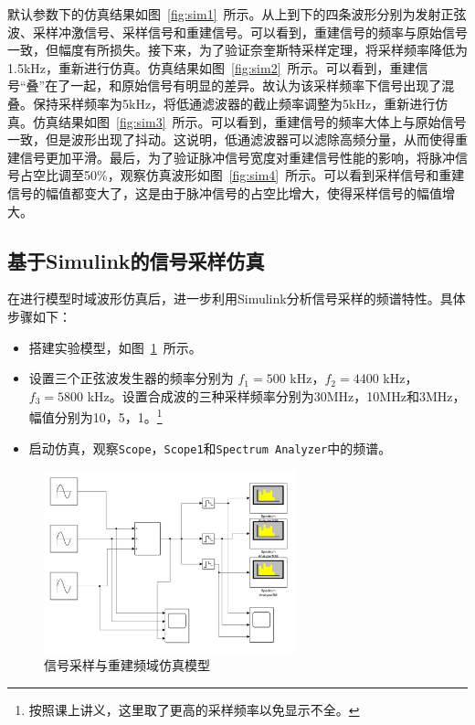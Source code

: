 默认参数下的仿真结果如图~\ref{fig:sim1}~所示。从上到下的四条波形分别为发射正弦波、采样冲激信号、采样信号和重建信号。可以看到，重建信号的频率与原始信号一致，但幅度有所损失。接下来，为了验证奈奎斯特采样定理，将采样频率降低为1.5kHz，重新进行仿真。仿真结果如图~\ref{fig:sim2}~所示。可以看到，重建信号“叠”在了一起，和原始信号有明显的差异。故认为该采样频率下信号出现了混叠。保持采样频率为5kHz，将低通滤波器的截止频率调整为5kHz，重新进行仿真。仿真结果如图~\ref{fig:sim3}~所示。可以看到，重建信号的频率大体上与原始信号一致，但是波形出现了抖动。这说明，低通滤波器可以滤除高频分量，从而使得重建信号更加平滑。最后，为了验证脉冲信号宽度对重建信号性能的影响，将脉冲信号占空比调至50\%，观察仿真波形如图~\ref{fig:sim4}~所示。可以看到采样信号和重建信号的幅值都变大了，这是由于脉冲信号的占空比增大，使得采样信号的幅值增大。


\subsection{基于Simulink的信号采样仿真}

在进行模型时域波形仿真后，进一步利用Simulink分析信号采样的频谱特性。具体步骤如下：
\begin{itemize}
  \item 搭建实验模型，如图~\ref{fig:model2}~所示。
  \item 设置三个正弦波发生器的频率分别为 $f_1 = 500$ kHz，$f_2 = 4400$ kHz，$f_3 = 5800$ kHz。设置合成波的三种采样频率分别为30MHz，10MHz和3MHz，幅值分别为10，5，1。\footnote{按照课上讲义，这里取了更高的采样频率以免显示不全。}
  \item 启动仿真，观察\lstinline{Scope}，\lstinline{Scope1}和\lstinline{Spectrum Analyzer}中的频谱。

\end{itemize}

\begin{figure}[htbp]
  \centering
  \includegraphics[width=0.65\textwidth]{figure/exp1/model2.png}
  \caption{信号采样与重建频域仿真模型}
  \label{fig:model2}
\end{figure}

